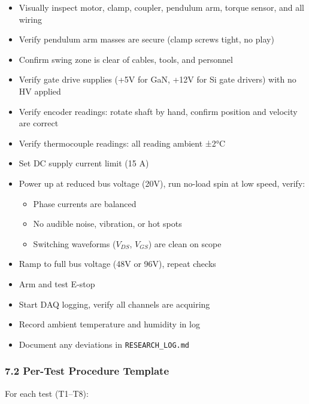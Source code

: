 \documentclass[
]{article}
\providecommand{\tightlist}{%
  \setlength{\itemsep}{0pt}\setlength{\parskip}{0pt}}
\begin{document}
\begin{itemize}
\tightlist
\item[$\square$]
  Visually inspect motor, clamp, coupler, pendulum arm, torque sensor,
  and all wiring
\item[$\square$]
  Verify pendulum arm masses are secure (clamp screws tight, no play)
\item[$\square$]
  Confirm swing zone is clear of cables, tools, and personnel
\item[$\square$]
  Verify gate drive supplies (+5V for GaN, +12V for Si gate drivers)
  with no HV applied
\item[$\square$]
  Verify encoder readings: rotate shaft by hand, confirm position and
  velocity are correct
\item[$\square$]
  Verify thermocouple readings: all reading ambient ±2°C
\item[$\square$]
  Set DC supply current limit (15 A)
\item[$\square$]
  Power up at reduced bus voltage (20V), run no-load spin at low speed,
  verify:

  \begin{itemize}
  \tightlist
  \item
    Phase currents are balanced
  \item
    No audible noise, vibration, or hot spots
  \item
    Switching waveforms (\(V_{DS}\), \(V_{GS}\)) are clean on scope
  \end{itemize}
\item[$\square$]
  Ramp to full bus voltage (48V or 96V), repeat checks
\item[$\square$]
  Arm and test E-stop
\item[$\square$]
  Start DAQ logging, verify all channels are acquiring
\item[$\square$]
  Record ambient temperature and humidity in log
\item[$\square$]
  Document any deviations in \texttt{RESEARCH\_LOG.md}
\end{itemize}

\subsubsection{7.2 Per-Test Procedure
Template}\label{per-test-procedure-template}

For each test (T1--T8):
\end{document}
